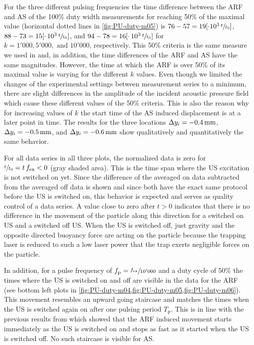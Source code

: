 For the three different pulsing frequencies the time difference between the ARF 
and AS of the 100\% duty width measurements for reaching 50\% of the maximal 
value (horizontal dotted lines in \cref{fig:PU-duty-m05}) is $76-57=19[\cdot 
10^{3}\,\sfrac{t}{t_{0}}]$, $88-73=15[\cdot\,10^{3}\,\sfrac{t}{t_{0}}]$, and 
$94-78=16[\cdot\,10^{3}\,\sfrac{t}{t_{0}}]$ for $k=1'000, 5'000,\text{ and } 
10'000$, respectively. This 50\% criteria is the same measure we used in 
\cite{Goering2021} and, in addition, the time differences of the ARF and AS 
have the same magnitudes. However, the time at which the ARF is over 50\% of 
its maximal value is varying for the different $k$ values. Even though we 
limited the changes of the experimental settings between measurement series to 
a minimum, there are slight differences in the amplitude of the incident 
acoustic pressure field which cause these different values of the 50\% 
criteria. This is also the reason why for increasing values of $k$  the start 
time of the AS induced displacement is at a later point in time. The results 
for the three locations $\Dy_{i} = \SI{-0.4}{\mm}$, $\Dy_{i} = \SI{-0.5}{\mm}$, 
and $\Dy_{i} = \SI{-0.6}{\mm}$ show qualitatively and quantitatively the same 
behavior.


For all data series in all three plots, the normalized data is zero for 
$\sfrac{t}{t_{0}}=t\,f_{\mathrm{ex}}<0$ (gray shaded area). This is the time span where 
the US excitation is not switched on yet. Since the difference of the averaged 
on data subtracted from the averaged off data is shown and since both have the 
exact same protocol before the US is switched on, this behavior is expected and 
serves as quality control of a data series. A value close to zero after $t>0$ 
indicates that there is no difference in the movement of the particle along 
this direction for a switched on US and a switched off US. When the US is 
switched off, just gravity and the opposite directed buoyancy force are acting 
on the particle because the trapping laser is reduced to such a low laser power 
that the trap exerts negligible forces on the particle.

In addition, for a pulse frequency of $f_{\mathrm{p}}=\sfrac{f_{\mathrm{ex}}}{10'000}$ and a duty 
cycle of 50\% the times where the US is switched on and off are visible in the 
data for the ARF (see bottom left plots in
\cref{fig:PU-duty-m04,fig:PU-duty-m05,fig:PU-duty-m06}). This movement resembles an 
upward going staircase and matches the times when the US is switched again on 
after one pulsing period $T_{\mathrm{p}}$. This is in line with the previous 
results from \cite{Goering2021} which showed that the ARF induced movement 
starts immediately as the US is switched on and stops as fast as it started 
when the US is switched off. No such staircase is visible for AS.

